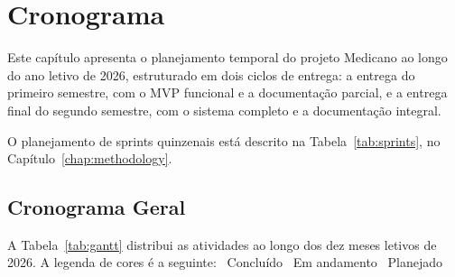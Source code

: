 \chapter{Cronograma}
\label{chap:schedule}

Este capítulo apresenta o planejamento temporal
do projeto Medicano ao longo do ano letivo de
2026, estruturado em dois ciclos de entrega: a
entrega do primeiro semestre, com o MVP funcional
e a documentação parcial, e a entrega final do
segundo semestre, com o sistema completo e a
documentação integral.

O planejamento de sprints quinzenais está descrito
na Tabela~\ref{tab:sprints}, no
Capítulo~\ref{chap:methodology}.

\section{Cronograma Geral}
\label{sec:gantt}

A Tabela~\ref{tab:gantt} distribui as atividades
ao longo dos dez meses letivos de 2026. A legenda
de cores é a seguinte:
\colorbox{primary!55}{\phantom{xxx}}~Concluído
\quad
\colorbox{primary!25}{\phantom{xxx}}~Em andamento
\quad
\colorbox{primary!12}{\phantom{xxx}}~Planejado

\vspace{6pt}

